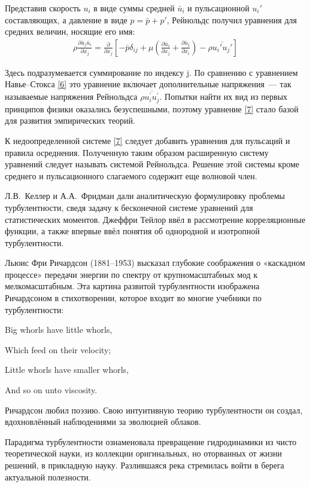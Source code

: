 Представив скорость $u_i$ в виде суммы средней $\bar u_i$ и пульсационной $u_i'$ составляющих, а давление 
в виде $p=\bar p+p'$, Рейнольдс получил уравнения для средних величин, носящие его имя:
\begin{gather}
\rho\frac{\partial \bar u_j \bar u_i}{\partial x_j} = \frac{\partial}{\partial x_j}\left[ -\bar p \delta_{ij} +
\mu \left ( \frac{\partial \bar u_i}{\partial x_j} + \frac{\partial \bar u_j}{\partial x_i} \right) - 
\rho \overline{ u_i' u_j'} \right]
\label{7}
\end{gather}

Здесь подразумевается суммирование по индексу j. По сравнению с уравнением Навье--Стокса \ref{6} это 
уравнение включает дополнительные напряжения~--- так называемые напряжения Рейнольдса 
$\rho \overline{u_i^\prime u_j^\prime}$. Попытки найти их вид из первых принципов физики оказались безуспешными, 
поэтому уравнение \ref{7} стало базой для развития эмпирических теорий.

К недоопределенной системе \ref{7} следует добавить уравнения для пульсаций и правила осреднения. 
Полученную таким образом расширенную систему уравнений следует называть системой Рейнольдса. Решение 
этой системы кроме среднего и пульсационного слагаемого содержит еще волновой член.

Л.В.~Келлер и А.А.~Фридман дали аналитическую формулировку проблемы турбулентности, сведя задачу к 
бесконечной системе уравнений для статистических моментов. Джеффри Тейлор ввёл в рассмотрение корреляционные 
функции, а также впервые ввёл понятия об однородной и изотропной турбулентности.

Льюис Фри Ричардсон (1881--1953) высказал глубокие соображения о «каскадном процессе» передачи энергии 
по спектру от крупномасштабных мод к мелкомасштабным. Эта картина развитой турбулентности изображена 
Ричардсоном в стихотворении, которое входит во многие учебники по турбулентности:
\begin{center}
Big whorls have little whorls,

Which feed on their velocity;

Little whorls have smaller whorls,

And so on unto viscosity.
\end{center}

Ричардсон любил поэзию. Свою интуитивную теорию турбулентности он создал, вдохновлённый наблюдениями 
за эволюцией облаков.

Парадигма турбулентности ознаменовала превращение гидродинамики из чисто теоретической науки, 
из коллекции оригинальных, но оторванных от жизни решений, в прикладную науку. Разлившаяся река 
стремилась войти в берега актуальной полезности.


